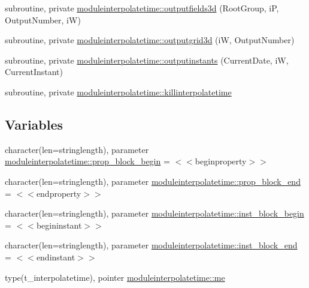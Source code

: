 \begin{DoxyCompactItemize}
\item 
subroutine, private \mbox{\hyperlink{namespacemoduleinterpolatetime_afb140a4246a55d10d57741eac9e8472e}{moduleinterpolatetime\+::outputfields3d}} (Root\+Group, iP, Output\+Number, iW)
\item 
subroutine, private \mbox{\hyperlink{namespacemoduleinterpolatetime_a0a16c53d72886b47809d200696776b0c}{moduleinterpolatetime\+::outputgrid3d}} (iW, Output\+Number)
\item 
subroutine, private \mbox{\hyperlink{namespacemoduleinterpolatetime_a74dbf441733e6031ead9d8056ffa421f}{moduleinterpolatetime\+::outputinstants}} (Current\+Date, iW, Current\+Instant)
\item 
subroutine, private \mbox{\hyperlink{namespacemoduleinterpolatetime_a8b49478334350c51e3c3ffbd530b77c7}{moduleinterpolatetime\+::killinterpolatetime}}
\end{DoxyCompactItemize}
\subsection*{Variables}
\begin{DoxyCompactItemize}
\item 
character(len=stringlength), parameter \mbox{\hyperlink{namespacemoduleinterpolatetime_a457f0bd08ea2d1cd3c378cb5b134579b}{moduleinterpolatetime\+::prop\+\_\+block\+\_\+begin}} = \textquotesingle{}$<$$<$beginproperty$>$$>$\textquotesingle{}
\item 
character(len=stringlength), parameter \mbox{\hyperlink{namespacemoduleinterpolatetime_aa46f26d9551bfc9f0e94e17fbdd10df0}{moduleinterpolatetime\+::prop\+\_\+block\+\_\+end}} = \textquotesingle{}$<$$<$endproperty$>$$>$\textquotesingle{}
\item 
character(len=stringlength), parameter \mbox{\hyperlink{namespacemoduleinterpolatetime_a899819c24884a5d5e96cfb388deebf35}{moduleinterpolatetime\+::inst\+\_\+block\+\_\+begin}} = \textquotesingle{}$<$$<$begininstant$>$$>$\textquotesingle{}
\item 
character(len=stringlength), parameter \mbox{\hyperlink{namespacemoduleinterpolatetime_a99b92f084d4e9d7ca5333ecb86693dc8}{moduleinterpolatetime\+::inst\+\_\+block\+\_\+end}} = \textquotesingle{}$<$$<$endinstant$>$$>$\textquotesingle{}
\item 
type(t\+\_\+interpolatetime), pointer \mbox{\hyperlink{namespacemoduleinterpolatetime_a4f11cedfc0e20d3f4435756c364ad041}{moduleinterpolatetime\+::me}}
\end{DoxyCompactItemize}

